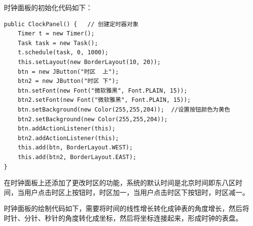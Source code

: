 \documentclass[UTF8,12pt]{article}
\begin{document}
时钟面板的初始化代码如下：

\begin{lstlisting}[title=时钟面板的初始化,frame=shadowbox]
    public ClockPanel() {   // 创建定时器对象
    Timer t = new Timer();
    Task task = new Task();
    t.schedule(task, 0, 1000);
    this.setLayout(new BorderLayout(10, 20));
    btn = new JButton("时区  上");
    btn2 = new JButton("时区 下");
    btn.setFont(new Font("微软雅黑", Font.PLAIN, 15));
    btn2.setFont(new Font("微软雅黑", Font.PLAIN, 15));
    btn.setBackground(new Color(255,255,204));  //设置按钮颜色为黄色
    btn2.setBackground(new Color(255,255,204));
    btn.addActionListener(this);
    btn2.addActionListener(this);
    this.add(btn, BorderLayout.WEST);
    this.add(btn2, BorderLayout.EAST);
}
\end{lstlisting}

在时钟面板上还添加了更改时区的功能，系统的默认时间是北京时间即东八区时间，当用户点击时区上按钮时，时区加一，当用户点击时区下按钮时，时区减一。

时钟面板的绘制代码如下，需要将时间的线性增长转化成钟表的角度增长，然后将时针、分针、秒针的角度转化成坐标，然后将坐标连接起来，形成时钟的表盘。
\end{document}
